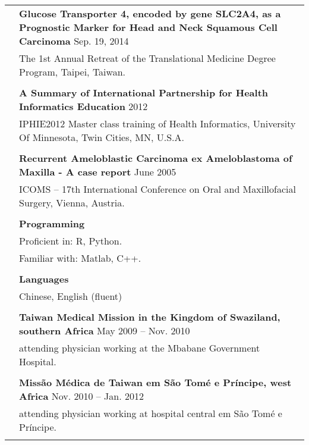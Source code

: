 \documentclass[letterpaper, 11pt]{article}
\begin{document}
\begin{longtable}{p{1.3in}p{4.8in}}
& \textbf{Glucose Transporter 4, encoded by gene
SLC2A4, as a Prognostic Marker for Head and Neck Squamous Cell
Carcinoma} \hfill Sep. 19, 2014 \\
& The 1st Annual Retreat of the Translational Medicine Degree Program, Taipei, Taiwan. \\
& \\


& \textbf{A Summary of International Partnership for Health Informatics Education} \hfill  2012 \\
& IPHIE2012 Master
class training of Health Informatics, University Of Minnesota, Twin
Cities, MN, U.S.A. \\
& \\

& \textbf{Recurrent Ameloblastic Carcinoma ex
Ameloblastoma of Maxilla - A case report} \hfill June 2005 \\
& ICOMS – 17th International
Conference on Oral and Maxillofacial Surgery, Vienna, Austria. \\
& \\




{\color{OliveGreen}{Skills}} 
& \textbf{Programming}\\
& Proficient in: R, Python. \\
& Familiar with: Matlab, C++. \\
& \\

& \textbf{Languages} \\
& Chinese, English (fluent) \\
& \\


\color{OliveGreen}{Service and outreach by TMU} %
& \textbf{Taiwan Medical Mission in the Kingdom of Swaziland, southern Africa} \hfill May 2009 -- Nov. 2010 \\
& attending physician working at the Mbabane Government Hospital. \\
& \\

& \textbf{Missão Médica de Taiwan em São Tomé e Príncipe, west Africa} \hfill Nov. 2010 -- Jan. 2012 \\
& attending physician working at hospital central em São Tomé e Príncipe. \\
& \\



\end{longtable}
\end{document}
